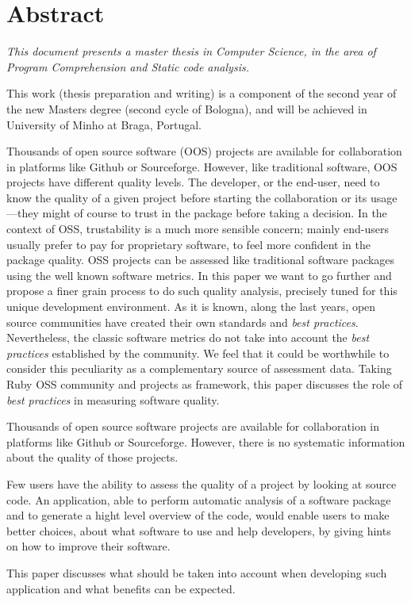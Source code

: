 \thispagestyle{plain}
\chapter*{Abstract}\label{chap:abstract}

{\it
This document presents a master thesis in Computer Science, in the area of \textit{Program Comprehension and Static code analysis}.

This work (thesis preparation and writing) is a component of the second year of the new Masters degree (second cycle of Bologna), and will be achieved in University of Minho at Braga, Portugal. 

 

  Thousands of open source software (OOS) projects are available for collaboration in platforms like Github or Sourceforge.
  However, like traditional software, OOS projects have different quality levels.
  The developer, or the end-user, need to know the quality of a given project before starting the collaboration
  or its usage---they might of course to trust in the package before taking a decision.
  In the context of OSS, trustability is a much more sensible concern; mainly end-users usually prefer to pay for
  proprietary software, to feel more confident in the package quality.
  OSS projects can be assessed like traditional software packages using the well known software metrics.
  In this paper we want to go further and propose a finer grain process to do such quality analysis,
  precisely tuned for this unique development environment.
  As it is known, along the last years, open source communities have created their own standards and \emph{best practices}.
  Nevertheless, the classic software metrics do not take into account the \emph{best practices}
  established by the community.
  We feel that it could be worthwhile to consider this peculiarity as a complementary source of assessment data.
  Taking Ruby OSS community and projects as framework, this paper discusses the role of
  \emph{best practices} in measuring software quality.

  Thousands of open source software projects are available for collaboration in platforms like Github or Sourceforge.
  However, there is no systematic information about the quality of those projects.
  
  Few users have the ability to assess the quality of a project by looking at source code. 
  An application, able to perform automatic analysis of a software package and to generate a hight level overview of the code,
  would enable users to make better choices, about what software to use and help developers,
  by giving hints on how to improve their software.
  
  This paper discusses what should be taken into account when developing such application and what benefits can be expected.

}
